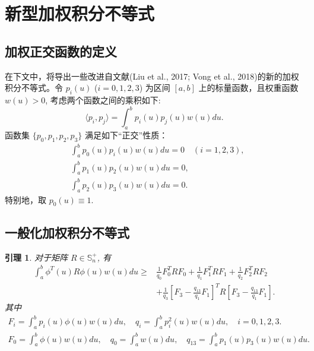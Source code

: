 \documentclass[a4paper, 12pt, oneside]{article}
\theoremstyle{cn_theorem}
\newtheorem{lemma}{引理}[section]   %
\begin{document}
\section{新型加权积分不等式}

\subsection{加权正交函数的定义}
在下文中，将导出一些改进自文献(Liu et al., 2017; Vong et al., 2018)的新的加权积分不等式。令 $p_i(u)$ ($i=0,1,2,3$) 为区间 $[a,b]$ 上的标量函数，且权重函数 $w(u) > 0$, 考虑两个函数之间的乘积如下:
\begin{equation*}
    \langle p_i, p_j \rangle = \int_a^b p_i(u) p_j(u) w(u) du.
\end{equation*}
函数集 $\{p_0, p_1, p_2, p_3\}$ 满足如下“正交”性质：
\begin{equation}
    \begin{aligned}
        & \int_a^b p_0(u) p_i(u) w(u) du = 0 \quad (i=1,2,3), \\
        & \int_a^b p_1(u) p_2(u) w(u) du = 0, \\
        & \int_a^b p_2(u) p_3(u) w(u) du = 0.
    \end{aligned}
\end{equation}
特别地，取 $p_0(u) \equiv 1$.

\subsection{一般化加权积分不等式}
\begin{lemma} \label{lemma:ori_2_3}
对于矩阵 $R \in \mathbb{S}_n^+$, 有
\begin{align} \label{eq:lemma23}
    \int_a^b \phi^T(u) R \phi(u) w(u) du \ge & \frac{1}{q_0} F_0^T R F_0 + \frac{1}{q_1} F_1^T R F_1 + \frac{1}{q_2} F_2^T R F_2 \nonumber \\
    & + \frac{1}{q_3} \left[ F_3 - \frac{q_{13}}{q_1} F_1 \right]^T R \left[ F_3 - \frac{q_{13}}{q_1} F_1 \right].
\end{align}
其中
\begin{gather*}
    F_i = \int_a^b p_i(u) \phi(u) w(u) du, \quad q_i = \int_a^b p_i^2(u) w(u) du, \quad i=0,1,2,3. \\
    F_0 = \int_a^b \phi(u) w(u) du, \quad q_0 = \int_a^b w(u) du, \quad q_{13} = \int_a^b p_1(u) p_3(u) w(u) du.
\end{gather*}
\end{lemma}
\end{document}
